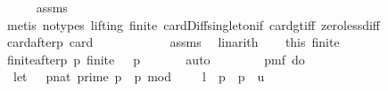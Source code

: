 \begin{isabellebody}
\ \ \ \ \isamarkupfalse%
\ assms{\isacharparenleft}{\kern0pt}{}{\isacharparenright}{\kern0pt}\ \isanewline
\ \ \ \ \isamarkupfalse%
\ {\isacharparenleft}{\kern0pt}metis\ {\isacharparenleft}{\kern0pt}no{\isacharunderscore}{\kern0pt}types{\isacharcomma}{\kern0pt}\ lifting{\isacharparenright}{\kern0pt}\ {\isasymK}{\isacharunderscore}{\kern0pt}finite{\isacharprime}{\kern0pt}\ card{\isacharunderscore}{\kern0pt}Diff{\isacharunderscore}{\kern0pt}singleton{\isacharunderscore}{\kern0pt}if\ card{\isacharunderscore}{\kern0pt}gt{\isacharunderscore}{\kern0pt}{}{\isacharunderscore}{\kern0pt}iff\ zero{\isacharunderscore}{\kern0pt}less{\isacharunderscore}{\kern0pt}diff{\isacharparenright}{\kern0pt}\isanewline
\ \ \isamarkupfalse%
\ \isamarkupfalse%
\ {\isasymK}{\isacharunderscore}{\kern0pt}card{\isacharunderscore}{\kern0pt}after{\isacharunderscore}{\kern0pt}p{\isacharcolon}{\kern0pt}\ {\isachardoublequoteopen}card\ {\isacharquery}{\kern0pt}{\isasymK}\ {\isacharminus}{\kern0pt}\ {}\ {\isachargreater}{\kern0pt}\ {}{\isachardoublequoteclose}\ \isanewline
\ \ \ \ \isamarkupfalse%
\ assms{\isacharparenleft}{\kern0pt}{}{\isacharparenright}{\kern0pt}\ \isamarkupfalse%
\ linarith\isanewline
\ \ \isamarkupfalse%
\ this\ {\isasymK}{\isacharunderscore}{\kern0pt}finite\ \isamarkupfalse%
\ {\isasymK}{\isacharunderscore}{\kern0pt}finite{\isacharunderscore}{\kern0pt}after{\isacharunderscore}{\kern0pt}p{\isacharcolon}{\kern0pt}\ {\isachardoublequoteopen}{\isasymAnd}p{\isachardot}{\kern0pt}\ finite\ {\isacharparenleft}{\kern0pt}{\isacharquery}{\kern0pt}{\isasymK}\ {\isacharminus}{\kern0pt}\ {\isacharbraceleft}{\kern0pt}p{\isacharbraceright}{\kern0pt}{\isacharparenright}{\kern0pt}{\isachardoublequoteclose}\ \isanewline
\ \ \ \ \isamarkupfalse%
\ auto\isanewline
\isanewline
\isanewline
\ \ \isamarkupfalse%
\ \isamarkupfalse%
\ {\isachardoublequoteopen}\isanewline
\ \ pmf\ {\isacharparenleft}{\kern0pt}do\ {\isacharbraceleft}{\kern0pt}\isanewline
\ \ let\ {\isasymK}\ {\isacharequal}{\kern0pt}\ {\isacharbraceleft}{\kern0pt}{\isacharparenleft}{\kern0pt}p{\isacharcolon}{\kern0pt}{\isacharcolon}{\kern0pt}nat{\isacharparenright}{\kern0pt}{\isachardot}{\kern0pt}\ prime\ p\ {\isasymand}\ p\ mod\ {}\ {\isacharequal}{\kern0pt}\ {}\ {\isasymand}\ l\ {\isasymle}\ p\ {\isasymand}\ p\ {\isasymle}\ u{\isacharbraceright}{\kern0pt}{\isacharsemicolon}{\kern0pt}\isanewline

\end{isabellebody}
